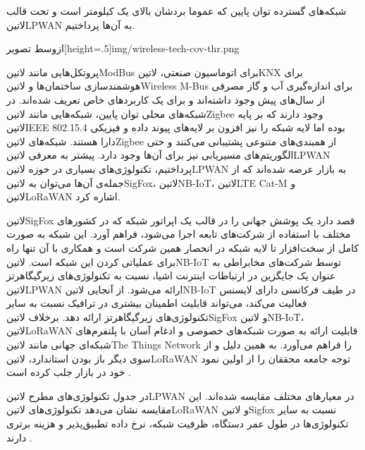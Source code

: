  شبکه‌های گسترده توان پایین که عموما بردشان بالای یک کیلومتر است و تحت قالب ‌لاتین{LPWAN} به آن‌ها پرداختیم.

‌ازوسط
‌تصویر[height=.5\textwidth]{img/wireless-tech-cov-thr.png}

پروتکل‌هایی مانند ‌لاتین{ModBus} برای اتوماسیون صنعتی، ‌لاتین{KNX} برای هوشمند‌سازی ساختمان‌ها و ‌لاتین{Wireless M-Bus} برای اندازه‌گیری آب و گاز مصرفی از سال‌های پیش وجود داشته‌اند
و برای یک کاربردهای خاص تعریف شده‌اند.
در شبکه‌های محلی توان پایین، شبکه‌هایی مانند ‌لاتین{Zigbee} وجود دارند که بر پایه ‌لاتین{IEEE 802.15.4} بوده اما لایه شبکه را نیز افزون بر لایه‌های پیوند داده و فیزیکی دارا هستند. شبکه‌های ‌لاتین{Zigbee}
از همبندی‌های متنوعی پشتیبانی می‌کنند و حتی الگوریتم‌های مسیریابی نیز برای آن‌ها وجود دارد.
پیشتر به معرفی ‌لاتین{LPWAN} پرداختیم، تکنولوژی‌های بسیاری در حوزه ‌لاتین{LPWAN} به بازار عرضه شده‌اند که از جمله‌ی آن‌ها می‌توان به ‌لاتین{SigFox}، ‌لاتین{NB-IoT}، ‌لاتین{LTE Cat-M} و ‌لاتین{LoRaWAN}
اشاره کرد.

‌لاتین{SigFox} قصد دارد یک پوشش جهانی را در قالب یک اپراتور شبکه که در کشورهای مختلف با استفاده از شرکت‌های تابعه اجرا می‌شود، فراهم آورد.
این شبکه به صورت کامل از سخت‌افزار تا لایه شبکه در انحصار همین شرکت است و همکاری با آن تنها راه برای عملیاتی کردن این شبکه است.
‌لاتین{NB-IoT} توسط شرکت‌های مخابراطی به عنوان یک جایگزین در ارتباطات اینترنت اشیا، نسبت به تکنولوژی‌های زیرگیگاهرتز ‌لاتین{LPWAN} ارائه می‌شود.
از آنجایی ‌لاتین{NB-IoT} در طیف فرکانسی دارای لایسنس فعالیت می‌کند، می‌تواند قابلیت اطمینان بیشتری در ترافیک نسبت به سایر تکنولوژی‌های زیرگیگاهرتز ارائه دهد.
برخلاف ‌لاتین{SigFox} و ‌لاتین{NB-IoT}، ‌لاتین{LoRaWAN} قابلیت ارائه به صورت شبکه‌های خصوصی و ادغام آسان با پلتفرم‌های شبکه‌ای جهانی مانند ‌لاتین{The Things Network} را فراهم می‌آورد.
به همین دلیل و از سوی دیگر باز بودن استاندارد، ‌لاتین{LoRaWAN} توجه جامعه محققان را از اولین نمود خود در بازار جلب کرده است
.

در جدول  تکنولوژی‌های مطرح ‌لاتین{LPWAN} در معیارهای مختلف مقایسه شده‌اند. این مقایسه نشان می‌دهد تکنولوژی‌های ‌لاتین{LoRaWAN}
و ‌لاتین{Sigfox} نسبت به سایر تکنولوژی‌ها در طول عمر دستگاه، ظرفیت شبکه، نرخ داده تطبیق‌پذیر و هزینه برتری دارند .

